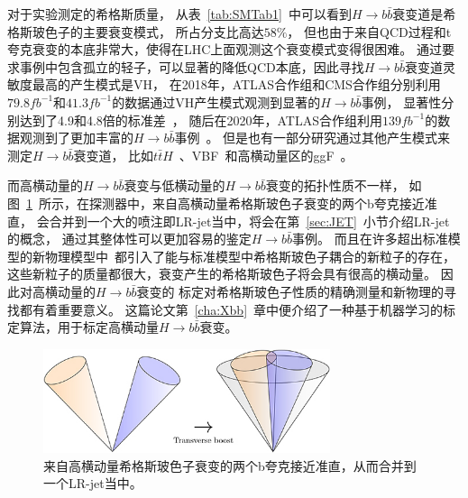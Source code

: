 对于实验测定的希格斯质量，
从表~\ref{tab:SMTab1}~中可以看到$H\rightarrow b\bar{b}$衰变道是希格斯玻色子的主要衰变模式，
所占分支比高达$58\%$，
但也由于来自QCD过程和t夸克衰变的本底非常大，使得在LHC上面观测这个衰变模式变得很困难。
通过要求事例中包含孤立的轻子，可以显著的降低QCD本底，因此寻找$H\rightarrow b\bar{b}$衰变道灵敏度最高的产生模式是VH，
在2018年，ATLAS合作组和CMS合作组分别利用$79.8fb^{-1}$和$41.3fb^{-1}$的数据通过VH产生模式观测到显著的$H\rightarrow b\bar{b}$事例，
显著性分别达到了4.9和4.8倍的标准差~\cite{AHbb8,CHbb3}，
随后在2020年，ATLAS合作组利用$139fb^{-1}$的数据观测到了更加丰富的$H\rightarrow b\bar{b}$事例~\cite{AHbb5}。
但是也有一部分研究通过其他产生模式来测定$H\rightarrow b\bar{b}$衰变道，
比如$t\bar{t}H$~\cite{AHbb7,AHbb8,CHbb1}、VBF~\cite{AHbb6}和高横动量区的ggF~\cite{CHbb3}。

而高横动量的$H\rightarrow b\bar{b}$衰变与低横动量的$H\rightarrow b\bar{b}$衰变的拓扑性质不一样，
如图~\ref{fig:Boosted1}~所示，在探测器中，来自高横动量希格斯玻色子衰变的两个b夸克接近准直，
会合并到一个大的喷注即LR-jet当中，将会在第~\ref{sec:JET}~小节介绍LR-jet的概念，
通过其整体性可以更加容易的鉴定$H\rightarrow b\bar{b}$事例。
而且在许多超出标准模型的新物理模型中~\cite{BSMHIGGS1,BSMHIGGS2,BSMHIGGS3}都引入了能与标准模型中希格斯玻色子耦合的新粒子的存在，
这些新粒子的质量都很大，衰变产生的希格斯玻色子将会具有很高的横动量。
因此对高横动量的$H\rightarrow b\bar{b}$衰变的
标定对希格斯玻色子性质的精确测量和新物理的寻找都有着重要意义。
这篇论文第~\ref{cha:Xbb}~章中便介绍了一种基于机器学习的标定算法，用于标定高横动量$H\rightarrow b \bar{b}$衰变。


\begin{figure}
  \begin{center}
    \includegraphics[width=0.75\textwidth]{figuresXbb/Boosted.jpg}
  \end{center}
  \caption{
来自高横动量希格斯玻色子衰变的两个b夸克接近准直，从而合并到一个LR-jet当中。
  }
    \label{fig:Boosted1}
\end{figure}







